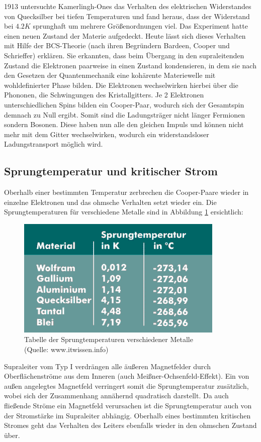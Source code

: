 		1913 untersuchte Kamerlingh-Ones das Verhalten des elektrischen Widerstandes von Quecksilber bei tiefen Temperaturen und fand heraus, dass der Widerstand bei $4.2\unit{K}$ sprunghaft um mehrere Größenordnungen viel. 
		Das Experiment hatte einen neuen Zustand der Materie aufgedeckt. 
		Heute lässt sich dieses Verhalten mit Hilfe der BCS-Theorie (nach ihren Begründern Bardeen, Cooper und Schrieffer) erklären.
		Sie erkannten, dass beim Übergang in den supraleitenden Zustand die Elektronen paarweise in einen Zustand kondensieren, in dem sie nach den Gesetzen der Quantenmechanik eine kohärente Materiewelle mit wohldefinierter Phase bilden.
		Die Elektronen wechselwirken hierbei über die Phononen, die Schwingungen des Kristallgitters.
		Je 2 Elektronen unterschiedlichen Spins bilden ein Cooper-Paar, wodurch sich der Gesamtspin demnach zu Null ergibt.
		Somit sind die Ladungsträger nicht länger Fermionen sondern Bosonen.
		Diese haben nun alle den gleichen Impuls und können nicht mehr mit dem Gitter wechselwirken, wodurch ein widerstandsloser Ladungstransport möglich wird.
	

	\subsection{Sprungtemperatur und kritischer Strom} %
	\label{sub:sprungtemperatur_und_kritischer_strom}
	
		Oberhalb einer bestimmten Temperatur zerbrechen die Cooper-Paare wieder in einzelne Elektronen und das ohmsche Verhalten setzt wieder ein.
		Die Sprungtemperaturen für verschiedene Metalle sind in Abbildung \ref{tallaalala} ersichtlich:
		\begin{figure}[H]
			\center
			\includegraphics[scale=0.7]{messwerte/materialien-fuer-supraleiter-und-deren-sprungtemperaturen-in-kelvin-und-grad-celsius.png}
			\caption{Tabelle der Sprungtemperaturen verschiedener Metalle \\(Quelle: www.itwissen.info)}
			\label{tallaalala}
		\end{figure}
		Supraleiter vom Typ I verdrängen alle äußeren Magnetfelder durch Oberflächenströme aus dem Inneren (auch Meißner-Ochsenfeld-Effekt).
		Ein von außen angelegtes Magnetfeld verringert somit die Sprungtemperatur zusätzlich, wobei sich der Zusammenhang annähernd quadratisch darstellt.
		Da auch fließende Ströme ein Magnetfeld verursachen ist die Sprungtemperatur auch von der Stromstärke im Supraleiter abhängig.
		Oberhalb eines bestimmten kritischen Stromes geht das Verhalten des Leiters ebenfalls wieder in den ohmschen Zustand über.

